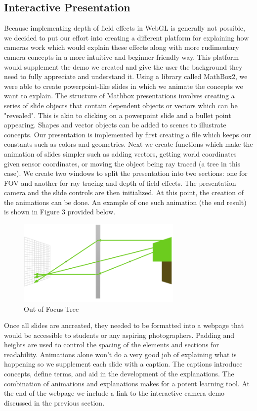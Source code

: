 \documentclass{acm_proc_article-sp}
\begin{document}
\subsection{Interactive Presentation}
Because implementing depth of field effects in WebGL is generally not possible,
we decided to put our effort into creating a different platform for explaining
how cameras work which would explain these effects along with more rudimentary
camera concepts in a more intuitive and beginner friendly way. This platform
would supplement the demo we created and give the user the background they need
to fully appreciate and understand it. Using a library called MathBox2, we were
able to create powerpoint-like slides in which we animate the concepts we want
to explain. The structure of Mathbox presentations involves creating a series
of slide objects that contain dependent objects or vectors which can be
"revealed". This is akin to clicking on a powerpoint slide and a bullet point
appearing. Shapes and vector objects can be added to scenes to illustrate
concepts. Our presentation is implemented by first creating a file which keeps
our constants such as colors and geometries. Next we create functions which
make the animation of slides simpler such as adding vectors, getting world
coordinates given sensor coordinates, or moving the object being ray traced (a
tree in this case). We create two windows to split the presentation into two
sections: one for FOV and another for ray tracing and depth of field effects.
The presentation camera and the slide controls are then initialized. At this
point, the creation of the animations can be done. An example of one such
animation (the end result) is shown in Figure 3 provided below.

\begin{figure}[h]
\caption{Out of Focus Tree }
\includegraphics[width=8cm]{images/outoffocus.png}
\end{figure}

Once all slides are  ancreated, they needed to be formatted into a webpage that would be accessible to students or any aspiring photographers. Padding and heights are used to control the spacing of the elements and sections for readability. Animations alone won't do a very good job of explaining what is happening so we supplement each slide with a caption. The captions introduce concepts, define terms, and aid in the development of the explanations. The combination of animations and explanations makes for a potent learning tool. At the end of the webpage we include a link to the interactive camera demo discussed in the previous section.
\end{document}
